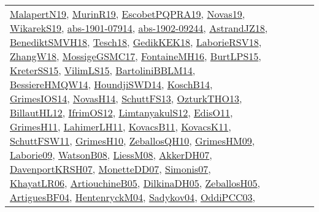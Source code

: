 {\begin{longtable}{llp{6cm}p{6cm}p{6cm}}
\href{papers/MalapertN19.pdf}{MalapertN19}\cite{MalapertN19}, \href{papers/MurinR19.pdf}{MurinR19}\cite{MurinR19}, \href{articles/EscobetPQPRA19.pdf}{EscobetPQPRA19}\cite{EscobetPQPRA19}, \href{articles/Novas19.pdf}{Novas19}\cite{Novas19}, \href{articles/WikarekS19.pdf}{WikarekS19}\cite{WikarekS19}, \href{articles/abs-1901-07914.pdf}{abs-1901-07914}\cite{abs-1901-07914}, \href{articles/abs-1902-09244.pdf}{abs-1902-09244}\cite{abs-1902-09244}, \href{papers/AstrandJZ18.pdf}{AstrandJZ18}\cite{AstrandJZ18}, \href{papers/BenediktSMVH18.pdf}{BenediktSMVH18}\cite{BenediktSMVH18}, \href{papers/Tesch18.pdf}{Tesch18}\cite{Tesch18}, \href{articles/GedikKEK18.pdf}{GedikKEK18}\cite{GedikKEK18}, \href{articles/LaborieRSV18.pdf}{LaborieRSV18}\cite{LaborieRSV18}, \href{articles/ZhangW18.pdf}{ZhangW18}\cite{ZhangW18}, \href{papers/MossigeGSMC17.pdf}{MossigeGSMC17}\cite{MossigeGSMC17}, \href{papers/FontaineMH16.pdf}{FontaineMH16}\cite{FontaineMH16}, \href{papers/BurtLPS15.pdf}{BurtLPS15}\cite{BurtLPS15}, \href{papers/KreterSS15.pdf}{KreterSS15}\cite{KreterSS15}, \href{papers/VilimLS15.pdf}{VilimLS15}\cite{VilimLS15}, \href{papers/BartoliniBBLM14.pdf}{BartoliniBBLM14}\cite{BartoliniBBLM14}, \href{papers/BessiereHMQW14.pdf}{BessiereHMQW14}\cite{BessiereHMQW14}, \href{papers/HoundjiSWD14.pdf}{HoundjiSWD14}\cite{HoundjiSWD14}, \href{papers/KoschB14.pdf}{KoschB14}\cite{KoschB14}, \href{articles/GrimesIOS14.pdf}{GrimesIOS14}\cite{GrimesIOS14}, \href{articles/NovasH14.pdf}{NovasH14}\cite{NovasH14}, \href{papers/SchuttFS13.pdf}{SchuttFS13}\cite{SchuttFS13}, \href{articles/OzturkTHO13.pdf}{OzturkTHO13}\cite{OzturkTHO13}, \href{papers/BillautHL12.pdf}{BillautHL12}\cite{BillautHL12}, \href{papers/IfrimOS12.pdf}{IfrimOS12}\cite{IfrimOS12}, \href{articles/LimtanyakulS12.pdf}{LimtanyakulS12}\cite{LimtanyakulS12}, \href{papers/EdisO11.pdf}{EdisO11}\cite{EdisO11}, \href{papers/GrimesH11.pdf}{GrimesH11}\cite{GrimesH11}, \href{papers/LahimerLH11.pdf}{LahimerLH11}\cite{LahimerLH11}, \href{articles/KovacsB11.pdf}{KovacsB11}\cite{KovacsB11}, \href{articles/KovacsK11.pdf}{KovacsK11}\cite{KovacsK11}, \href{articles/SchuttFSW11.pdf}{SchuttFSW11}\cite{SchuttFSW11}, \href{papers/GrimesH10.pdf}{GrimesH10}\cite{GrimesH10}, \href{articles/ZeballosQH10.pdf}{ZeballosQH10}\cite{ZeballosQH10}, \href{papers/GrimesHM09.pdf}{GrimesHM09}\cite{GrimesHM09}, \href{papers/Laborie09.pdf}{Laborie09}\cite{Laborie09}, \href{papers/WatsonB08.pdf}{WatsonB08}\cite{WatsonB08}, \href{articles/LiessM08.pdf}{LiessM08}\cite{LiessM08}, \href{papers/AkkerDH07.pdf}{AkkerDH07}\cite{AkkerDH07}, \href{papers/DavenportKRSH07.pdf}{DavenportKRSH07}\cite{DavenportKRSH07}, \href{papers/MonetteDD07.pdf}{MonetteDD07}\cite{MonetteDD07}, \href{articles/Simonis07.pdf}{Simonis07}\cite{Simonis07}, \href{articles/KhayatLR06.pdf}{KhayatLR06}\cite{KhayatLR06}, \href{papers/ArtiouchineB05.pdf}{ArtiouchineB05}\cite{ArtiouchineB05}, \href{papers/DilkinaDH05.pdf}{DilkinaDH05}\cite{DilkinaDH05}, \href{articles/ZeballosH05.pdf}{ZeballosH05}\cite{ZeballosH05}, \href{papers/ArtiguesBF04.pdf}{ArtiguesBF04}\cite{ArtiguesBF04}, \href{papers/HentenryckM04.pdf}{HentenryckM04}\cite{HentenryckM04}, \href{papers/Sadykov04.pdf}{Sadykov04}\cite{Sadykov04}, \href{papers/OddiPCC03.pdf}{OddiPCC03}\cite{OddiPCC03}, 
\end{longtable}}
